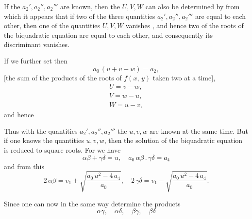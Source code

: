 
If the $a_2', a_2'', a_2'''$ are known, then the $U, V, W$
can also be determined by
from which it appears that if two of the three quantities $a_2', a_2'', a_2'''$
are equal to each other, then one of the quantities $U, V, W$ vanishes
, and hence two of the roots of the biquadratic equation
are equal to each other, and consequently its discriminant vanishes.

If we further set
then
\[
a_0\,(u + v + w) = a_2,
\]
[the sum of the products of the roots of $f(x,\,y)$ taken two at a time],
\[
\begin{gathered}
U = v - w,\\
V = w - u,\\
W = u - v,
\end{gathered}
\]
and hence

Thus with the quantities $a_2', a_2'', a_2'''$ the $u, v, w$ are known
at the same time. But if one knows the quantities $u, v, w$, then
the solution of the biquadratic equation is reduced to square roots.
For we have
\[
\alpha\beta + \gamma\delta = u, \quad a_0\,\alpha\beta\,.\,\gamma\delta = a_4
\]
and from this
\[
2\,\alpha\beta = v_1 + \sqrt{\frac{a_0\,u^2 - 4\,a_4}{a_0}}, \quad
2\,\gamma\delta = v_1 - \sqrt{\frac{a_0\,u^2 - 4\,a_4}{a_0}}.
\]

Since one can now in the same way determine the products
\[
\alpha\gamma, \quad \alpha\delta, \quad \beta\gamma, \quad \beta\delta
\]
